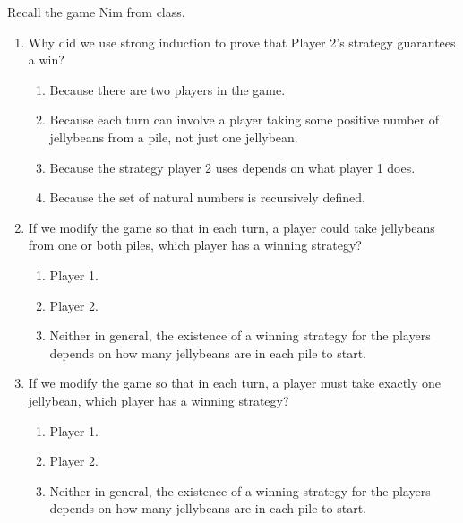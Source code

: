 
Recall the game Nim from class.

\begin{enumerate}
    \item Why did we use strong induction to prove that Player 2's strategy guarantees a win?
    \begin{enumerate}
        \item Because there are two players in the game.
        \item Because each turn can involve a player taking some positive number 
        of jellybeans from a pile, not just one jellybean.
        \item Because the strategy player 2 uses depends on what player 1 does.
        \item Because the set of natural numbers is recursively defined.
    \end{enumerate}
    \item  If we modify the game so that in each turn, a player could take jellybeans
    from one or both piles, which player has a winning strategy?
    \begin{enumerate}
        \item Player 1.
        \item Player 2.
        \item Neither in general, the existence of a winning strategy for the players depends 
        on how many jellybeans are in each pile to start.
    \end{enumerate}
    \item  If we modify the game so that in each turn, a player must take 
    exactly one jellybean, which player has a winning strategy?
    \begin{enumerate}
        \item Player 1.
        \item Player 2.
        \item Neither in general, the existence of a winning strategy for the players depends 
        on how many jellybeans are in each pile to start.
    \end{enumerate}
\end{enumerate}
